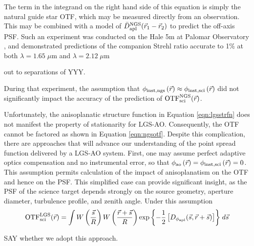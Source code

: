 The term in the integrand on the right hand side of this equation is
simply the natural guide star OTF, which may be measured
directly from an observation.  This may be combined with a model of
$\bar{D}^{\rm NGS}_{\rm apl}(\vec{r}_{1} - \vec{r}_{2})$ to
predict the off-axis PSF.  Such an experiment was
conducted on the Hale 5m at Palomar Observatory
\cite{Britton:2006}, and demonstrated predictions of the
companion Strehl ratio accurate to 1\% at both $\lambda=1.65\;\mu$m and
$\lambda=2.12\;\mu$m
\begin{notes}
out to separations of YYY.
\end{notes}
During that experiment, the
assumption that $\phi_{\rm inst,ngs}\left(\vec{r}\right) \approx
\phi_{\rm inst,sci}\left(\vec{r}\right)$ did not significantly
impact the accuracy of the prediction of ${\rm OTF}^{\rm NGS}_{\rm
  sci}(\vec{r})$.

Unfortunately, the anisoplanatic structure function in Equation
\ref{eqn:lgsstrfn} does not manifest the property of stationarity for LGS-AO.  
Consequently, the OTF cannot be factored as shown in Equation
\ref{eqn:ngsotf}.  Despite this complication, there are approaches that
will advance our understanding of the point spread function delivered
by a LGS-AO system.  First, one may assume
perfect adaptive optics compensation and no instrumental error, so
that $\phi_{\rm ao}\left(\vec{r}\right) = 
\phi_{\rm inst,sci}\left(\vec{r}\right) = 0$.  This assumption permits
calculation of the impact of anisoplanatism on the OTF 
and hence on the PSF. This simplified case
can provide significant insight, as the PSF of the science target depends
strongly on the source geometry, aperture diameter, turbulence
profile, and zenith angle.  Under this assumption
\begin{equation}\label{eqn:lgsotfa}
\begin{aligned}
{\rm OTF}^{\rm LGS}_{\rm sci}(\vec{r}) = 
\int 
W \left( \frac{\vec{s}}{R} \right)
W \left( \frac{\vec{r} + \vec{s}}{R} \right) 
\exp{\left\{ -\frac{1}{2} \left[
D_{\rm \phi_{apl}}(\vec{s}, \vec{r} + \vec{s})
\right] \right\}}
\; d\vec{s} 
\end{aligned}
\end{equation}
\begin{notes}
SAY whether we adopt this approach.
\end{notes}

